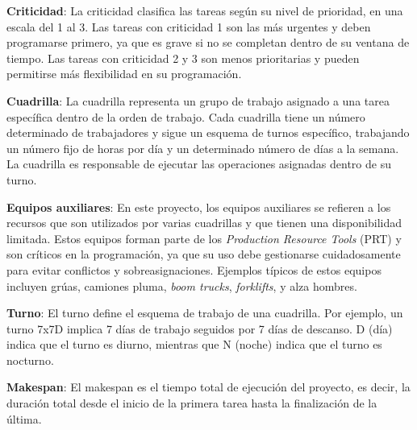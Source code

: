 \documentclass{article}
\begin{document}
\textbf{Criticidad}: La criticidad clasifica las tareas según su nivel de prioridad, en una escala del 1 al 3. Las tareas con criticidad 1 son las más urgentes y deben programarse primero, ya que es grave si no se completan dentro de su ventana de tiempo. Las tareas con criticidad 2 y 3 son menos prioritarias y pueden permitirse más flexibilidad en su programación.


\textbf{Cuadrilla}: La cuadrilla representa un grupo de trabajo asignado a una tarea específica dentro de la orden de trabajo. Cada cuadrilla tiene un número determinado de trabajadores y sigue un esquema de turnos específico, trabajando un número fijo de horas por día y un determinado número de días a la semana. La cuadrilla es responsable de ejecutar las operaciones asignadas dentro de su turno.

\textbf{Equipos auxiliares}: En este proyecto, los equipos auxiliares se refieren a los recursos que son utilizados por varias cuadrillas y que tienen una disponibilidad limitada. Estos equipos forman parte de los \textit{Production Resource Tools} (PRT) y son críticos en la programación, ya que su uso debe gestionarse cuidadosamente para evitar conflictos y sobreasignaciones. Ejemplos típicos de estos equipos incluyen grúas, camiones pluma, \textit{boom trucks}, \textit{forklifts}, y alza hombres.

\textbf{Turno}: El turno define el esquema de trabajo de una cuadrilla. Por ejemplo, un turno 7x7D implica 7 días de trabajo seguidos por 7 días de descanso. D (día) indica que el turno es diurno, mientras que N (noche) indica que el turno es nocturno.

\textbf{Makespan}: El makespan es el tiempo total de ejecución del proyecto, es decir, la duración total desde el inicio de la primera tarea hasta la finalización de la última.


\end{document}
